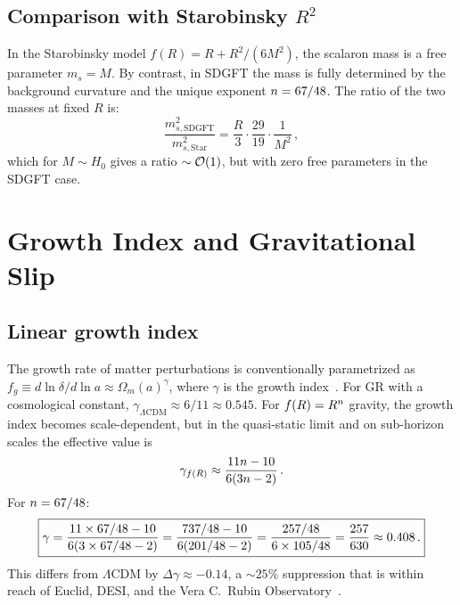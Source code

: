 \documentclass[amsmath,amssymb,aps,prd,twocolumn,superscriptaddress,nofootinbib]{revtex4-2}
\begin{document}
\subsection{Comparison with Starobinsky $R^2$}

In the Starobinsky model $f(R) = R + R^2/(6M^2)$, the scalaron
mass is a free parameter $m_s = M$.  By contrast, in SDGFT the
mass is fully determined by the background curvature and the
unique exponent $n = 67/48$.  The ratio of the two masses
at fixed $R$ is:
\begin{equation}
  \frac{m_{s,\mathrm{SDGFT}}^2}{m_{s,\mathrm{Star}}^2}
    = \frac{R}{3} \cdot \frac{29}{19} \cdot \frac{1}{M^2}\,,
  \label{eq:mass_comparison}
\end{equation}
which for $M \sim H_0$ gives a ratio $\sim \mathcal{O}\!\left(1\right)$, but with
zero free parameters in the SDGFT case.

\section{Growth Index and Gravitational Slip}
\label{sec:growth}

\subsection{Linear growth index}

The growth rate of matter perturbations is conventionally
parametrized as $f_g \equiv d\ln\delta/d\ln a \approx
\Omega_m(a)^\gamma$, where $\gamma$ is the growth
index~\cite{Linder2005,Linder2007}.  For GR with a cosmological
constant, $\gamma_{\Lambda\mathrm{CDM}} \approx 6/11 \approx 0.545$.
For $f(R) = R^{n}$ gravity, the growth index becomes
scale-dependent, but in the quasi-static limit and on sub-horizon
scales the effective value is~\cite{Gannouji2009,Tsujikawa2009}
\begin{equation}
  \gamma_{f(R)} \approx \frac{11n - 10}{6(3n - 2)}\,.
  \label{eq:gamma_fR}
\end{equation}
For $n = 67/48$:
\begin{equation}
  \boxed{%
    \gamma = \frac{11 \times 67/48 - 10}{6(3 \times 67/48 - 2)}
           = \frac{737/48 - 10}{6(201/48 - 2)}
           = \frac{257/48}{6 \times 105/48}
           = \frac{257}{630}
           \approx 0.408\,.
  }
  \label{eq:gamma_value}
\end{equation}
This differs from $\Lambda$CDM by $\Delta\gamma \approx -0.14$,
a $\sim 25\%$ suppression that is within reach of Euclid, DESI,
and the Vera C.\ Rubin Observatory~\cite{Euclid2020,DESI2024}.
\end{document}
